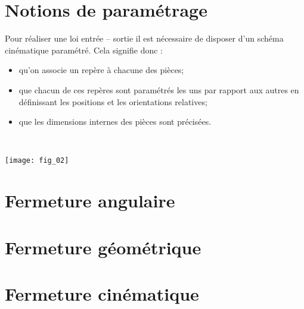 \section{Notions de paramétrage}
Pour réaliser une loi entrée -- sortie il est nécessaire de disposer d'un schéma cinématique paramétré. Cela signifie donc :
\begin{itemize}
\item qu'on associe un repère à chacune des pièces;
\item que chacun de ces repères sont paramétrés les uns par rapport aux autres en définissant les positions et les orientations relatives;
\item que les dimensions internes des pièces sont précisées. 
\end{itemize}

\begin{exemple}~\\
\begin{center}
\texttt{[image: fig\_02]}
\end{center}
\end{exemple}
\section{Fermeture angulaire}
\section{Fermeture géométrique}
\section{Fermeture cinématique}


%
%
%
